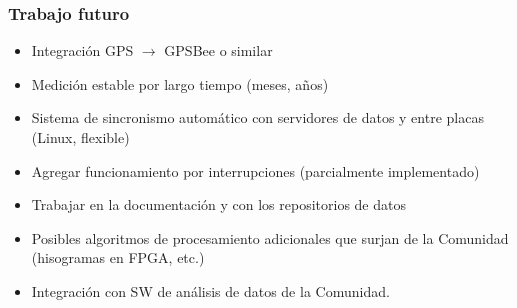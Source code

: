 \documentclass{beamer}
\begin{document}
\begin{frame}
				\frametitle{Trabajo futuro}
				\begin{exampleblock}{}
								\begin{itemize}
												\item Integración GPS $\to$ GPSBee o similar 
												\item Medición estable por largo tiempo (meses, años)
												\item Sistema de sincronismo automático con servidores de datos y entre
																placas (Linux, flexible)
												\item Agregar funcionamiento por interrupciones (parcialmente
																implementado)
												\item Trabajar en la documentación y con los repositorios de datos
												\item Posibles algoritmos de procesamiento adicionales que surjan de la
																Comunidad (hisogramas en FPGA, etc.)
												\item Integración con SW de análisis de datos de la
																Comunidad.
								\end{itemize}
				\end{exampleblock}
\end{frame}
\end{document}
